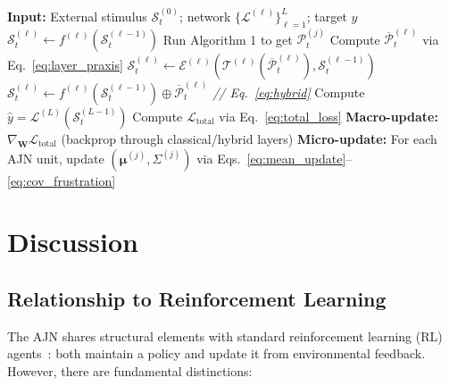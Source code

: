 \documentclass[12pt,a4paper]{article}
\begin{document}
\begin{algorithm}[H]
\caption{ANN-$\Psi$ Forward Pass and Update}
\begin{algorithmic}[1]
\STATE \textbf{Input:} External stimulus $\mathcal{S}_t^{(0)}$; network
       $\{{\mathcal{L}^{(\ell)}}\}_{\ell=1}^{L}$; target $y$
        \STATE $\mathcal{S}_t^{(\ell)} \leftarrow f^{(\ell)}(\mathcal{S}_t^{(\ell-1)})$
            \STATE Run Algorithm 1 to get $\mathcal{P}_t^{(j)}$
        \ENDFOR
        \STATE Compute $\overline{\mathcal{P}}_t^{(\ell)}$ via
               Eq.~\eqref{eq:layer_praxis}
        \STATE $\mathcal{S}_t^{(\ell)} \leftarrow \mathcal{E}^{(\ell)}(
               \mathcal{T}^{(\ell)}(\overline{\mathcal{P}}_t^{(\ell)}),
               \mathcal{S}_t^{(\ell-1)})$
        \STATE $\mathcal{S}_t^{(\ell)} \leftarrow f^{(\ell)}(\mathcal{S}_t^{(\ell-1)})
               \oplus \overline{\mathcal{P}}_t^{(\ell)}$
        \hfill \textit{// Eq.~\eqref{eq:hybrid}}
    \ENDIF
\ENDFOR
\STATE Compute $\hat{y} = \mathcal{L}^{(L)}(\mathcal{S}_t^{(L-1)})$
\STATE Compute $\mathcal{L}_{\text{total}}$ via Eq.~\eqref{eq:total_loss}
\STATE \textbf{Macro-update:} $\nabla_{\mathbf{W}} \mathcal{L}_{\text{total}}$
       (backprop through classical/hybrid layers)
\STATE \textbf{Micro-update:} For each AJN unit, update
       $(\boldsymbol{\mu}^{(j)}, \Sigma^{(j)})$ via
       Eqs.~\eqref{eq:mean_update}--\eqref{eq:cov_frustration}
\end{algorithmic}
\end{algorithm}

\section{Discussion}
\label{sec:discussion}

\subsection{Relationship to Reinforcement Learning}

The AJN shares structural elements with standard reinforcement learning (RL)
agents~\cite{sutton1998rl}: both maintain a policy and update it from
environmental feedback. However, there are fundamental distinctions:
\end{document}
